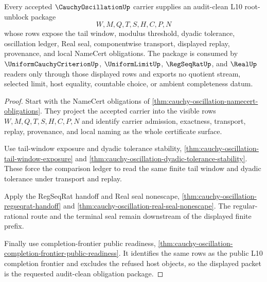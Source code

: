 \begin{theorem}
\label{thm:cauchy-oscillation-auditclean-obligation-package}
Every accepted $\CauchyOscillationUp$ carrier supplies an audit-clean L10 root-unblock package
$$
W,M,Q,T,S,H,C,P,N
$$
whose rows expose the tail window, modulus threshold, dyadic tolerance, oscillation ledger, Real seal, componentwise transport, displayed replay, provenance, and local NameCert obligations. The package is consumed by $\UniformCauchyCriterionUp$, $\UniformLimitUp$, $\RegSeqRatUp$, and $\RealUp$ readers only through those displayed rows and exports no quotient stream, selected limit, host equality, countable choice, or ambient completeness datum.
\end{theorem}
\begin{proof}
Start with the NameCert obligations of \autoref{thm:cauchy-oscillation-namecert-obligations}. They project the accepted carrier into the visible rows $W,M,Q,T,S,H,C,P,N$ and identify carrier admission, exactness, transport, replay, provenance, and local naming as the whole certificate surface.

Use tail-window exposure and dyadic tolerance stability, \autoref{thm:cauchy-oscillation-tail-window-exposure} and \autoref{thm:cauchy-oscillation-dyadic-tolerance-stability}. These force the comparison ledger to read the same finite tail window and dyadic tolerance under transport and replay.

Apply the RegSeqRat handoff and Real seal nonescape, \autoref{thm:cauchy-oscillation-regseqrat-handoff} and \autoref{thm:cauchy-oscillation-real-seal-nonescape}. The regular-rational route and the terminal seal remain downstream of the displayed finite prefix.

Finally use completion-frontier public readiness, \autoref{thm:cauchy-oscillation-completion-frontier-public-readiness}. It identifies the same rows as the public L10 completion frontier and excludes the refused host objects, so the displayed packet is the requested audit-clean obligation package.
\end{proof}

